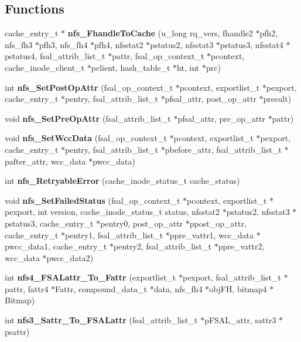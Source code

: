 \subsection*{Functions}
\begin{CompactItemize}
\item 
cache\_\-entry\_\-t $\ast$ {\bf nfs\_\-Fhandle\-To\-Cache} (u\_\-long rq\_\-vers, fhandle2 $\ast$pfh2, nfs\_\-fh3 $\ast$pfh3, nfs\_\-fh4 $\ast$pfh4, nfsstat2 $\ast$pstatus2, nfsstat3 $\ast$pstatus3, nfsstat4 $\ast$pstatus4, fsal\_\-attrib\_\-list\_\-t $\ast$pattr, fsal\_\-op\_\-context\_\-t $\ast$pcontext, cache\_\-inode\_\-client\_\-t $\ast$pclient, hash\_\-table\_\-t $\ast$ht, int $\ast$prc)
\item 
int {\bf nfs\_\-Set\-Post\-Op\-Attr} (fsal\_\-op\_\-context\_\-t $\ast$pcontext, exportlist\_\-t $\ast$pexport, cache\_\-entry\_\-t $\ast$pentry, fsal\_\-attrib\_\-list\_\-t $\ast$pfsal\_\-attr, post\_\-op\_\-attr $\ast$presult)
\item 
void {\bf nfs\_\-Set\-Pre\-Op\-Attr} (fsal\_\-attrib\_\-list\_\-t $\ast$pfsal\_\-attr, pre\_\-op\_\-attr $\ast$pattr)
\item 
void {\bf nfs\_\-Set\-Wcc\-Data} (fsal\_\-op\_\-context\_\-t $\ast$pcontext, exportlist\_\-t $\ast$pexport, cache\_\-entry\_\-t $\ast$pentry, fsal\_\-attrib\_\-list\_\-t $\ast$pbefore\_\-attr, fsal\_\-attrib\_\-list\_\-t $\ast$pafter\_\-attr, wcc\_\-data $\ast$pwcc\_\-data)
\item 
int {\bf nfs\_\-Retryable\-Error} (cache\_\-inode\_\-status\_\-t cache\_\-status)
\item 
void {\bf nfs\_\-Set\-Failed\-Status} (fsal\_\-op\_\-context\_\-t $\ast$pcontext, exportlist\_\-t $\ast$pexport, int version, cache\_\-inode\_\-status\_\-t status, nfsstat2 $\ast$pstatus2, nfsstat3 $\ast$pstatus3, cache\_\-entry\_\-t $\ast$pentry0, post\_\-op\_\-attr $\ast$ppost\_\-op\_\-attr, cache\_\-entry\_\-t $\ast$pentry1, fsal\_\-attrib\_\-list\_\-t $\ast$ppre\_\-vattr1, wcc\_\-data $\ast$pwcc\_\-data1, cache\_\-entry\_\-t $\ast$pentry2, fsal\_\-attrib\_\-list\_\-t $\ast$ppre\_\-vattr2, wcc\_\-data $\ast$pwcc\_\-data2)
\item 
int {\bf nfs4\_\-FSALattr\_\-To\_\-Fattr} (exportlist\_\-t $\ast$pexport, fsal\_\-attrib\_\-list\_\-t $\ast$pattr, fattr4 $\ast$Fattr, compound\_\-data\_\-t $\ast$data, nfs\_\-fh4 $\ast$obj\-FH, bitmap4 $\ast$Bitmap)
\item 
int {\bf nfs3\_\-Sattr\_\-To\_\-FSALattr} (fsal\_\-attrib\_\-list\_\-t $\ast$p\-FSAL\_\-attr, sattr3 $\ast$psattr)
\item 

\end{CompactItemize}
